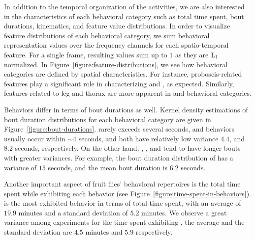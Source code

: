 In addition to the temporal organization of the activities, we are also interested in the characteristics of each behavioral category such as total time spent, bout durations, kinematics, and feature value distributions.
In order to visualize feature distributions of each behavioral category, we sum behavioral representation values over the frequency channels for each spatio-temporal feature.
For a single frame, resulting values sum up to $1$ as they are $\textnormal{L}_1$ normalized.
In Figure~\ref{figure:feature-distributions}, we see how behavioral categories are defined by spatial characteristics.
For instance, proboscis-related features play a significant role in characterizing \Feeding and \ProboscisPumping, as expected.
Similarly, features related to leg and thorax are more apparent in \Grooming and \PosturalAdjustment behavioral categories.

Behaviors differ in terms of bout durations as well.
Kernel density estimations of bout duration distributions for each behavioral category are given in Figure~\ref{figure:bout-durations}.
\CHaltereSwitch rarely exceeds several seconds, and \PosturalAdjustment behaviors usually occur within ${\sim}4$ seconds, and both have relatively low variance $4.4$, and $8.2$ seconds, respectively.
On the other hand, \CFeeding, \ProboscisPumping, and \Grooming tend to have longer bouts with greater variances.
For example, the bout duration distribution of \Grooming has a variance of $15$ seconds, and the mean bout duration is $6.2$ seconds.

Another important aspect of fruit flies' behavioral repertoires is the total time spent while exhibiting each behavior (see Figure~\ref{figure:time-spent-in-behaviors}).
\CGrooming is the most exhibited behavior in terms of total time spent, with an average of $19.9$ minutes and a standard deviation of $5.2$ minutes.
We observe a great variance among experiments for the time spent exhibiting \HaltereSwitch, the average and the standard deviation are $4.5$ minutes and $5.9$ respectively.

